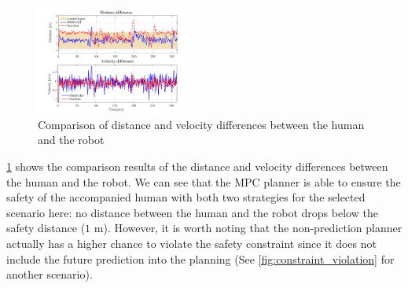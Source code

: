 \documentclass[journal]{IEEEtran}
\begin{document}
\begin{figure}
\centering	\includegraphics[width=0.46\textwidth]{figures/diff}
		\caption{Comparison of distance and velocity differences between the human and the robot}
		\label{fig:err_d}
\end{figure}
	\cref{fig:err_d} shows the comparison results of the distance and velocity differences between the human and the robot.
    We can see that the MPC planner is able to ensure the safety of the accompanied human with both two strategies for the selected scenario here: no distance between the human and the robot drops below the safety distance ($1$ m). 
    However, it is worth noting that the non-prediction planner actually has a higher chance to violate the safety constraint since it does not include the future prediction into the planning (See \cref{fig:constraint_violation} for another scenario).   
\end{document}
